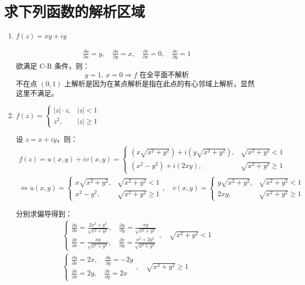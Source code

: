 \documentclass[UTF8]{report}
\theoremstyle{MyLineTheoremStyle} %
\theoremstyle{MyBlockTheoremStyle} %
\theoremstyle{MySubsubsectionStyle} %
\begin{document}
\section{求下列函数的解析区域}
\begin{enumerate}
\item $f(z) = xy+iy$

\begin{gather*}
\frac{\partial u }{\partial x } = y, \quad \frac{\partial u }{\partial y } = x ,\quad 
\frac{\partial v }{\partial x } = 0, \quad \frac{\partial v }{\partial y } = 1
\end{gather*}
欲满足 C-R 条件，则：
\begin{equation*}
y=1,\  x = 0 \Longrightarrow \text{$f$ 在全平面不解析}
\end{equation*}
不在点 $(0,1)$ 上解析是因为在某点解析是指在此点的有心邻域上解析，显然这里不满足。

\item  $ f(z) = \begin{cases}
    | z | \cdot z, &| z | <1 \\ 
    z^2,  &|z|  \geqslant 1
\end{cases} $ 

设 $z = x +iy$，则：
\begin{gather*}
f(z) = u(x,y) + iv(x,y) = 
\begin{cases}
    (x\sqrt{x^2+y^2}) + i(y\sqrt{x^2+y^2}), &\sqrt{x^2+y^2} < 1 \\ 
    (x^2 - y^2) + i(2xy), &\sqrt{x^2+y^2} \geqslant 1
\end{cases} \\ 
\Longleftrightarrow 
u(x,y) = 
\begin{cases}
    x\sqrt{x^2+y^2},&  \sqrt{x^2+y^2} < 1 \\ 
    x^2 - y^2, & \sqrt{x^2+y^2} \geqslant 1
\end{cases} ,\quad
v(x,y) = 
\begin{cases}
    y\sqrt{x^2+y^2}, & \sqrt{x^2+y^2} < 1 \\ 
    2xy, & \sqrt{x^2+y^2} \geqslant 1
\end{cases} 
\end{gather*}

分别求偏导得到：
\begin{gather*}
\begin{cases}
\frac{\partial u }{\partial x } = \frac{2x^2 + y^2}{\sqrt{x^2 + y^2}}
,\quad \frac{\partial u }{\partial y } = \frac{xy}{\sqrt{x^2 + y^2}} \\
\frac{\partial v }{\partial x } = \frac{xy}{\sqrt{x^2 + y^2}}
,\quad \frac{\partial v }{\partial y } = \frac{x^2 + 2y^2}{\sqrt{x^2 + y^2}}
\end{cases}
,\quad \sqrt{x^2+y^2} < 1  \\
\begin{cases}
    \frac{\partial u }{\partial x } = 2x
    ,\quad 
    \frac{\partial u }{\partial y } = -2y \\
\frac{\partial v }{\partial x } = 2y
,\quad \frac{\partial v }{\partial y } = 2x
\end{cases}
,\quad \sqrt{x^2+y^2} \geqslant 1
\end{gather*}


\end{enumerate}
\end{document}
